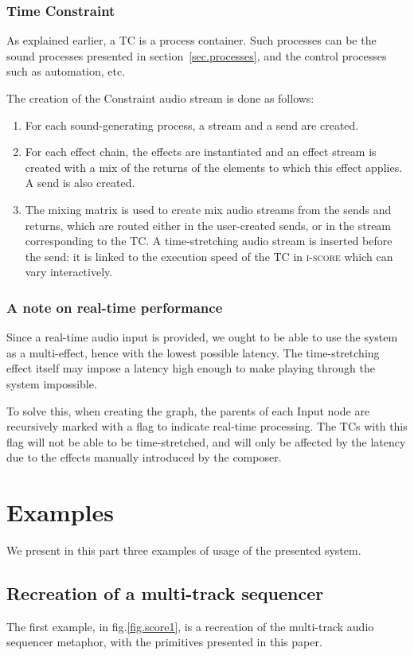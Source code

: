 \documentclass{article}
\newcommand*{\iscore}{\textsc{i-score}\xspace}
\newcommand*{\timeconstraint}{\ac{TC}\xspace}
\newcommand*{\timeconstraints}{\acp{TC}\xspace}
\begin{document}
\subsubsection{Time Constraint}
As explained earlier, a \timeconstraint is a process container.
Such processes can be the sound processes presented in section~\ref{sec.processes}, and 
the control processes such as automation, etc.

The creation of the Constraint audio stream is done as follows: 
\begin{enumerate}
    \item For each sound-generating process, a stream and a send are created.
    \item For each effect chain, the effects are instantiated and an effect stream is created with a mix of the returns of the elements to which this effect applies.
    A send is also created.
    \item The mixing matrix is used to create mix audio streams from the sends and returns, which are routed either in the user-created sends, or in the stream corresponding to the \timeconstraint.
    A time-stretching audio stream is inserted before the send: it is linked to the execution speed of the \timeconstraint in \iscore which can vary interactively.
\end{enumerate} 

\subsubsection{A note on real-time performance}
Since a real-time audio input is provided, we ought to be able to 
use the system as a multi-effect, hence with the lowest possible latency.
The time-stretching effect itself may impose a latency high enough to make 
playing through the system impossible.

To solve this, when creating the graph, the parents of each Input node are recursively marked 
with a flag to indicate real-time processing. 
The \timeconstraints with this flag will not be able to be time-stretched, and will only 
be affected by the latency due to the effects manually introduced by the composer.

\section{Examples}
We present in this part three examples of usage of the presented system.

\subsection{Recreation of a multi-track sequencer}
The first example, in fig.\ref{fig.score1}, is a recreation of the multi-track audio sequencer metaphor, with the primitives presented in this paper.
 
\end{document}
